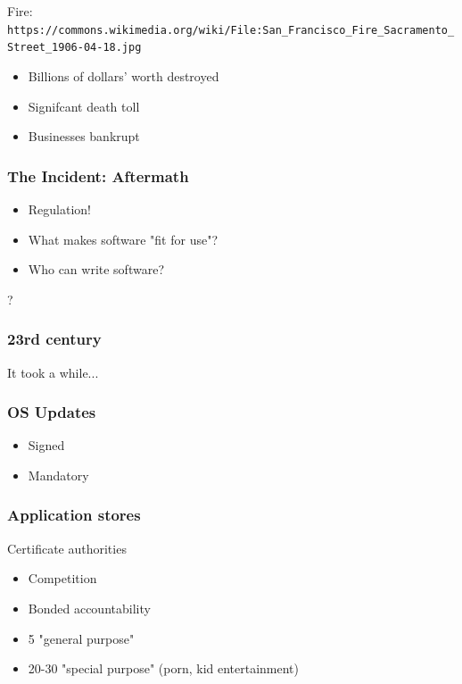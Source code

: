 Fire: \verb|https://commons.wikimedia.org/wiki/File:San_Francisco_Fire_Sacramento_Street_1906-04-18.jpg|

\begin{itemize}
\item Billions of dollars' worth destroyed
\item Signifcant death toll
\item Businesses bankrupt
\end{itemize}

\begin{frame}[fragile]
\frametitle{The Incident: Aftermath}


\end{frame}

\begin{itemize}
\item Regulation!
\item What makes software "fit for use"?
\item Who can write software?
\end{itemize}?

\begin{frame}[fragile]
\frametitle{23rd century}

It took a while...

\end{frame}

\begin{frame}[fragile]
\frametitle{OS Updates}

\begin{itemize}
\item Signed
\item Mandatory
\end{itemize}

\end{frame}

\begin{frame}[fragile]
\frametitle{Application stores}

Certificate authorities

\end{frame}

\begin{itemize}
\item Competition
\item Bonded accountability
\item 5 "general purpose"
\item 20-30 "special purpose" (porn, kid entertainment)
\end{itemize}

